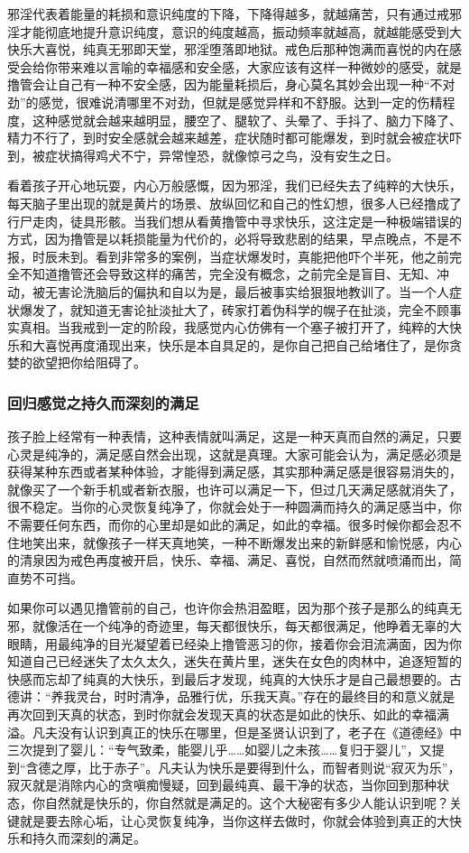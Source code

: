 邪淫代表着能量的耗损和意识纯度的下降，下降得越多，就越痛苦，只有通过戒邪淫才能彻底地提升意识纯度，意识的纯度越高，振动频率就越高，就越能感受到大快乐大喜悦，纯真无邪即天堂，邪淫堕落即地狱。戒色后那种饱满而喜悦的内在感受会给你带来难以言喻的幸福感和安全感，大家应该有这样一种微妙的感受，就是撸管会让自己有一种不安全感，因为能量耗损后，身心莫名其妙会出现一种“不对劲”的感觉，很难说清哪里不对劲，但就是感觉异样和不舒服。达到一定的伤精程度，这种感觉就会越来越明显，腰空了、腿软了、头晕了、手抖了、脑力下降了、精力不行了，到时安全感就会越来越差，症状随时都可能爆发，到时就会被症状吓到，被症状搞得鸡犬不宁，异常惶恐，就像惊弓之鸟，没有安生之日。

看着孩子开心地玩耍，内心万般感慨，因为邪淫，我们已经失去了纯粹的大快乐，每天脑子里出现的就是黄片的场景、放纵回忆和自己的性幻想，很多人已经撸成了行尸走肉，徒具形骸。当我们想从看黄撸管中寻求快乐，这注定是一种极端错误的方式，因为撸管是以耗损能量为代价的，必将导致悲剧的结果，早点晚点，不是不报，时辰未到。看到非常多的案例，当症状爆发时，真能把他吓个半死，他之前完全不知道撸管还会导致这样的痛苦，完全没有概念，之前完全是盲目、无知、冲动，被无害论洗脑后的偏执和自以为是，最后被事实给狠狠地教训了。当一个人症状爆发了，就知道无害论扯淡扯大了，砖家打着伪科学的幌子在扯淡，完全不顾事实真相。当我戒到一定的阶段，我感觉内心仿佛有一个塞子被打开了，纯粹的大快乐和大喜悦再度涌现出来，快乐是本自具足的，是你自己把自己给堵住了，是你贪婪的欲望把你给阻碍了。

\subsubsection{回归感觉之持久而深刻的满足}

孩子脸上经常有一种表情，这种表情就叫满足，这是一种天真而自然的满足，只要心灵是纯净的，满足感自然会出现，这就是真理。大家可能会认为，满足感必须是获得某种东西或者某种体验，才能得到满足感，其实那种满足感是很容易消失的，就像买了一个新手机或者新衣服，也许可以满足一下，但过几天满足感就消失了，很不稳定。当你的心灵恢复纯净了，你就会处于一种圆满而持久的满足感当中，你不需要任何东西，而你的心里却是如此的满足，如此的幸福。很多时候你都会忍不住地笑出来，就像孩子一样天真地笑，一种不断爆发出来的新鲜感和愉悦感，内心的清泉因为戒色再度被开启，快乐、幸福、满足、喜悦，自然而然就喷涌而出，简直势不可挡。

如果你可以遇见撸管前的自己，也许你会热泪盈眶，因为那个孩子是那么的纯真无邪，就像活在一个纯净的奇迹里，每天都很快乐，每天都很满足，他睁着无辜的大眼睛，用最纯净的目光凝望着已经染上撸管恶习的你，接着你会泪流满面，因为你知道自己已经迷失了太久太久，迷失在黄片里，迷失在女色的肉林中，追逐短暂的快感而忘却了纯真的大快乐，到最后才发现，纯真的大快乐才是自己最想要的。古德讲：“养我灵台，时时清净，品雅行优，乐我天真。”存在的最终目的和意义就是再次回到天真的状态，到时你就会发现天真的状态是如此的快乐、如此的幸福满溢。凡夫没有认识到真正的快乐在哪里，但是圣贤认识到了，老子在《道德经》中三次提到了婴儿：“专气致柔，能婴儿乎……如婴儿之未孩……复归于婴儿”，又提到“含德之厚，比于赤子”。凡夫认为快乐是要得到什么，而智者则说“寂灭为乐”，寂灭就是消除内心的贪嗔痴慢疑，回到最纯真、最干净的状态，当你回到那种状态，你自然就是快乐的，你自然就是满足的。这个大秘密有多少人能认识到呢？关键就是要去除心垢，让心灵恢复纯净，当你这样去做时，你就会体验到真正的大快乐和持久而深刻的满足。

